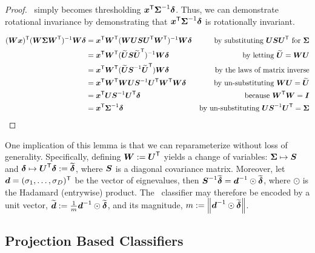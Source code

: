\documentclass[10pt]{article}
\begin{document}
\begin{proof}
\Lda~simply becomes thresholding $\boldsymbol{x}^{\mathsf{T}} \boldsymbol{\Sigma}^{-1} \boldsymbol{\delta}$.  Thus, we can demonstrate rotational invariance by demonstrating that $\boldsymbol{x}^{\mathsf{T}} \boldsymbol{\Sigma}^{-1} \boldsymbol{\delta}$ is rotationally invariant. 


\begin{align*}
(\bW \bx) \T  (\bW \bSig \bW\T )^{-1} \bW \bdel  %
&= \bx\T \bW\T  (\bW \bU \bS \bU\T \bW\T)^{-1} \bW \bdel & \text{by substituting $\bU \bS \bU\T$ for $\bSig$} \\
&= \bx\T \bW\T  (\mt{\bU} \bS \mt{\bU}\T)^{-1} \bW \bdel & \text{by letting $\mt{\bU}=\bW \bU$} \\
&= \bx\T \bW\T  (\mt{\bU} \bS^{-1} \mt{\bU}\T) \bW \bdel & \text{by the laws of matrix inverse} \\
&= \bx\T \bW\T  \bW \bU \bS^{-1}  \bU\T \bW\T \bW \bdel & \text{by un-substituting $\bW \bU=\mt{\bU}$} \\
&= \bx\T  \bU \bS^{-1}  \bU\T  \bdel  & \text{because $\bW\T \bW = \bI$} \\
&= \bx\T   \bSig^{-1} \bdel & \text{by un-substituting $\bU \bS^{-1} \bU\T = \bSig$}
\end{align*}
\end{proof}

One implication of this lemma is that we can reparameterize without loss of generality.  Specifically, defining $\boldsymbol{W} := \boldsymbol{U}^{\mathsf{T}}$ yields a change of variables: $\boldsymbol{\Sigma} \mapsto \boldsymbol{S}$ and $\boldsymbol{\delta} \mapsto \boldsymbol{U}^{\mathsf{T}} \boldsymbol{\delta} := \widetilde{\boldsymbol{\delta}}$, where $\boldsymbol{S}$ is a diagonal covariance matrix.  Moreover, let $\boldsymbol{d}=(\sigma_1,\ldots, \sigma_D)^{\mathsf{T}}$ be the vector of eignevalues, then $\boldsymbol{S}^{-1} \widetilde{\boldsymbol{\delta}}=\boldsymbol{d}^{-1} \odot \widetilde{\boldsymbol{\delta}}$, where $\odot$ is the Hadamard (entrywise) product.  The \Lda~classifier may therefore be encoded by a unit vector, $\widetilde{\boldsymbol{d}}:= \frac{1}{m} \boldsymbol{d}^{-1} \odot \widetilde{\boldsymbol{\delta}}$, and its magnitude, $m:=\left \lVert\boldsymbol{d}^{-1} \odot \widetilde{\boldsymbol{\delta}} \right \rVert$.


\subsection{Projection Based Classifiers}
\end{document}
